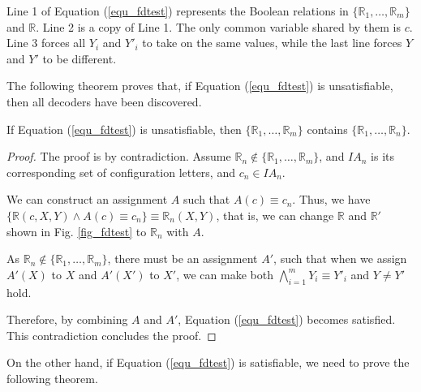 \documentclass[journal]{IEEEtran}
\begin{document}
Line 1 of Equation (\ref{equ_fdtest}) represents the Boolean relations in $\{\mathbb{R}_1,\dots,\mathbb{R}_{m}\}$ and $\mathbb{R}$.
Line 2 is a copy of Line 1.
The only common variable shared by them is $c$.
Line 3 forces all $Y_i$ and $Y'_i$ to take on the same values,
while the last line forces $Y$ and $Y'$ to be different.

The following theorem proves that,
if Equation (\ref{equ_fdtest}) is unsatisfiable,
then all decoders have been discovered.

\begin{theorem}\label{thm_fdok}
If Equation (\ref{equ_fdtest}) is unsatisfiable,
then $\{\mathbb{R}_1,\dots,\mathbb{R}_{m}\}$ contains $\{\mathbb{R}_1,\dots,\mathbb{R}_{n}\}$.
\end{theorem}
\begin{proof}
The proof is by contradiction.
Assume $\mathbb{R}_n\notin \{\mathbb{R}_1,\dots,\mathbb{R}_m\}$,
and $IA_n$ is its corresponding set of configuration letters,
and $c_n\in IA_n$.

We can construct an assignment $A$ such that $A(c)\equiv c_n$.
Thus,
we have $\{\mathbb{R}(c,X,Y)\wedge A(c)\equiv c_n\} \equiv \mathbb{R}_n(X,Y)$,
that is,
we can change $\mathbb{R}$ and $\mathbb{R}'$ shown in Fig. \ref{fig_fdtest} to $\mathbb{R}_n$ with $A$.

As $\mathbb{R}_n\notin \{\mathbb{R}_1,\dots,\mathbb{R}_m\}$,
there must be an assignment $A'$,
such that when we assign $A'(X)$ to $X$ and $A'(X')$ to $X'$,
we can make both $\bigwedge_{i=1}^{m}Y_i\equiv Y'_i$ and $Y\ne Y'$ hold.

Therefore,
by combining $A$ and $A'$,
Equation (\ref{equ_fdtest}) becomes satisfied.
This contradiction concludes the proof.
\end{proof}



On the other hand,
if Equation (\ref{equ_fdtest}) is satisfiable,
we need to prove the following theorem.
\end{document}
